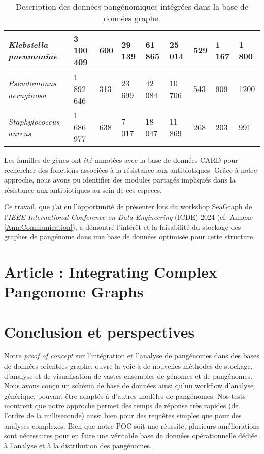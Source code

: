 \begin{table}[htbp]
\begin{tabular}{|p{}|p{}|p{}|p{}|p{}|p{}|p{}|p{}|p{}|}
  \hline 
    \textit{Klebsiella pneumoniae} & 3 100 409 &     600 &   29 139 &   61 865 &   25 014 &     529 &    1 167 &    1 800  \\
    \hline
  \textit{Pseudomonas aeruginosa} & 1 892 646 &     313 &   23 699 &   42 084 &   10 706 &     543 &     909 &    1200  \\
  \hline 
  \textit{Staphylococcus aureus} & 1 686 977 &     638 &    7 017 &   18 047 &   11 869 &     268 &     203 &     991  \\
  \hline
\end{tabular}
\caption{Description des données pangénomiques intégrées dans la base de données graphe.}\label{tab:dataspec}
\end{table}

\newpage
Les familles de gènes ont été annotées avec la base de données CARD \cite{alcock_card_2023} pour rechercher des fonctions associées à la résistance aux antibiotiques. Grâce à notre approche, nous avons pu identifier des modules partagés impliqués dans la résistance aux antibiotiques au sein de ces espèces.

Ce travail, que j'ai eu l'opportunité de présenter lors du workshop SeaGraph de l'\textit{IEEE International Conference on Data Engineering} (ICDE) 2024 (cf. Annexe \ref{Ann:Communication}), a démontré l’intérêt et la faisabilité du stockage des graphes de pangénome dans une base de données optimisée pour cette structure.

\chapter{Article : Integrating Complex Pangenome Graphs}



\chapter{Conclusion et perspectives}

Notre \textit{proof of concept} sur l'intégration et l'analyse de pangénomes dans des bases de données orientées graphe, ouvre la voie à de nouvelles méthodes de stockage, d’analyse et de visualisation de vastes ensembles de génomes et de pangénomes. Nous avons conçu un schéma de base de données ainsi qu’un workflow d’analyse générique, pouvant être adaptés à d'autres modèles de pangénomes. Nos tests montrent que notre approche permet des temps de réponse très rapides (de l’ordre de la milliseconde) aussi bien pour des requêtes simples que pour des analyses complexes. Bien que notre POC soit une réussite, plusieurs améliorations sont nécessaires pour en faire une véritable base de données opérationnelle dédiée à l’analyse et à la distribution des pangénomes.

